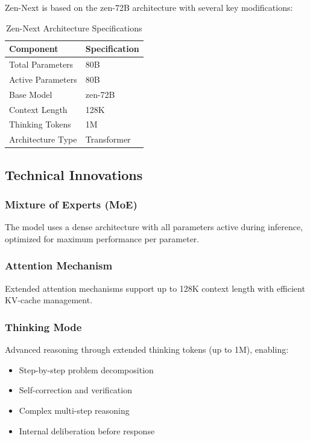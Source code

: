 \documentclass[11pt,a4paper]{article}
\begin{document}
Zen-Next is based on the zen-72B architecture with several key modifications:

\begin{table}[H]
\centering
\begin{tabular}{ll}
\toprule
\textbf{Component} & \textbf{Specification} \\
\midrule
Total Parameters & 80B \\
Active Parameters & 80B \\
Base Model & zen-72B \\
Context Length & 128K \\
Thinking Tokens & 1M \\

Architecture Type & Transformer \\
\bottomrule
\end{tabular}
\caption{Zen-Next Architecture Specifications}
\end{table}

\subsection{Technical Innovations}

\subsubsection{Mixture of Experts (MoE)}
The model uses a dense architecture with all parameters active during inference, optimized for maximum performance per parameter.

\subsubsection{Attention Mechanism}
Extended attention mechanisms support up to 128K context length with efficient KV-cache management.

\subsubsection{Thinking Mode}
Advanced reasoning through extended thinking tokens (up to 1M), enabling:
\begin{itemize}
    \item Step-by-step problem decomposition
    \item Self-correction and verification
    \item Complex multi-step reasoning
    \item Internal deliberation before response
\end{itemize}
\end{document}
